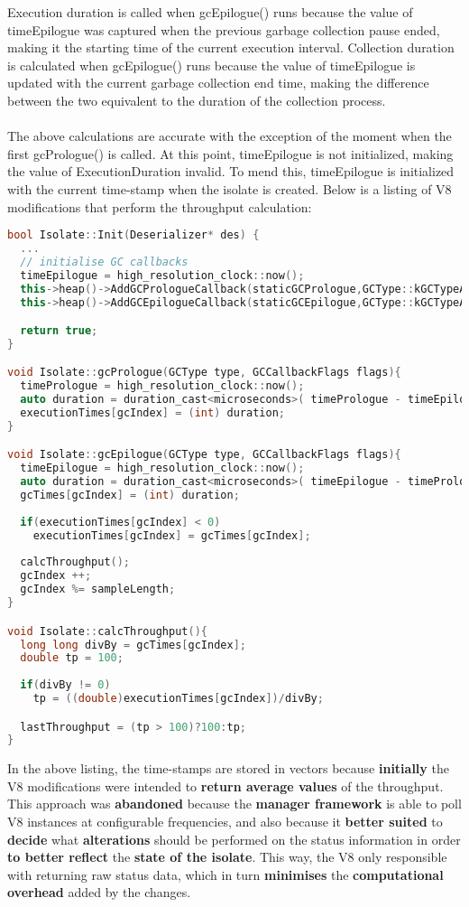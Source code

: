 \documentclass{l4proj}
\begin{document}
Execution duration is called when gcEpilogue() runs because the value of timeEpilogue was captured when the previous garbage collection pause ended, making it the starting time of the current execution interval. Collection duration is calculated when gcEpilogue() runs because the value of timeEpilogue is updated with the current garbage collection end time, making the difference between the two equivalent to the duration of the collection process. 
\\\\
\hspace*{3em} The above calculations are accurate with the exception of the moment when the first gcPrologue() is called. At this point, timeEpilogue is not initialized, making the value of ExecutionDuration invalid. To mend this, timeEpilogue is initialized with the current time-stamp when the isolate is created. Below is a listing of V8 modifications that perform the throughput calculation:
\begin{lstlisting}[language=cpp]
bool Isolate::Init(Deserializer* des) {
  ...
  // initialise GC callbacks
  timeEpilogue = high_resolution_clock::now();
  this->heap()->AddGCPrologueCallback(staticGCPrologue,GCType::kGCTypeAll,true);
  this->heap()->AddGCEpilogueCallback(staticGCEpilogue,GCType::kGCTypeAll,true);

  return true;
}

void Isolate::gcPrologue(GCType type, GCCallbackFlags flags){
  timePrologue = high_resolution_clock::now();
  auto duration = duration_cast<microseconds>( timePrologue - timeEpilogue ).count();
  executionTimes[gcIndex] = (int) duration;
}

void Isolate::gcEpilogue(GCType type, GCCallbackFlags flags){
  timeEpilogue = high_resolution_clock::now();
  auto duration = duration_cast<microseconds>( timeEpilogue - timePrologue ).count();
  gcTimes[gcIndex] = (int) duration;
  
  if(executionTimes[gcIndex] < 0)
    executionTimes[gcIndex] = gcTimes[gcIndex];
  
  calcThroughput();  
  gcIndex ++;
  gcIndex %= sampleLength;
}

void Isolate::calcThroughput(){
  long long divBy = gcTimes[gcIndex];
  double tp = 100;
  
  if(divBy != 0)
    tp = ((double)executionTimes[gcIndex])/divBy;

  lastThroughput = (tp > 100)?100:tp;
}
\end{lstlisting}
\hspace*{3em} In the above listing, the time-stamps are stored in vectors because \textbf{initially} the V8 modifications were intended to \textbf{return average values} of the throughput. This approach was \textbf{abandoned} because the \textbf{manager framework} is able to poll V8 instances at configurable frequencies, and also because it \textbf{better suited} to \textbf{decide} what \textbf{alterations} should be performed on the status information in order \textbf{to better reflect} the \textbf{state of the isolate}. This way, the V8 only responsible with returning raw status data, which in turn \textbf{minimises} the \textbf{computational overhead} added by the changes. 
\end{document}
